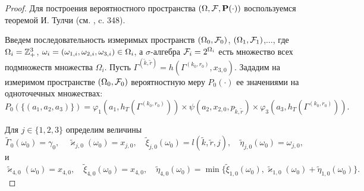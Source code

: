 \documentclass[a4paper,twoside]{article}
\theoremstyle{theorem}
\theoremstyle{remark}
\renewcommand*{\hm}[1]{#1\nobreak\discretionary{}%
	{\hbox{$\mathsurround=0pt #1$}}{}}%
\renewcommand{\Pr}{{\mathbf P}}
\begin{document}
\begin{proof}

Для построения вероятностного пространства $(\Omega, {\cal F}, \Pr(\cdot))$ воспользуемся теоремой И. Тулчи (см. \cite{Shiryaev}, c. 348). 

Введем последовательность измеримых пространств $(\Omega_0, {\cal F}_0)$, $(\Omega_1, {\cal F}_1)$,$\ldots$, где $\Omega_i\hm=\mathbb{Z}_+^3$, $\omega_i=(\omega_{1,i},\omega_{2,i},\omega_{3,i}) \hm\in \Omega_i$, а $\sigma$-алгебра ${\cal F}_i=2^{\Omega_i}$  есть множество всех подмножеств множества $\Omega_i$. 
Пусть $\Gamma^{(\tilde{k},\tilde{r})}=h(\Gamma^{(k_0,r_0)},x_{3,0})$.
Зададим на измеримом пространстве $(\Omega_0, {\cal F}_0)$ вероятностную меру $P_0(\cdot)$ ее значениями на одноточечных множествах:
\begin{equation}
P_0(\{(a_1,a_2,a_3)\})=\varphi_1(a_1,h_T(\Gamma^{(k_0,r_0)})) \times \psi(a_2,x_{2,0}, p_{\tilde{k},\tilde{r}}) \times \varphi_3(a_3,h_T(\Gamma^{(k_0,r_0)})).
\label{probabilitiesOne}
\end{equation}

Для $j\in \{1,2,3\}$ определим величины
\begin{equation}
\tilde{\Gamma}_0(\omega_0)=\gamma_0, \quad \tilde{\varkappa}_{j,0}(\omega_0)=x_{j,0}, \quad \tilde{\xi}_{j,0}(\omega_0)=l(\tilde{k},\tilde{r},j), \quad \tilde{\eta}_{j,0}(\omega_0)=\omega_{j,0},
\label{startRekOne}
\end{equation}
и
\begin{equation}
 \tilde{\varkappa}_{4,0}(\omega_0)=x_{4,0}, \quad \tilde{\xi}_{4,0}(\omega_0)=x_{4,0}, \quad \tilde{\eta}_{4,0}(\omega_0)=\min\{\tilde{\xi}_{1,0}(\omega_0), \tilde{\varkappa}_{1,0}(\omega_0)+\tilde{\eta}_{1,0}(\omega_0)\}.
\label{startRekTwo}
\end{equation}


\end{proof}
\end{document}
